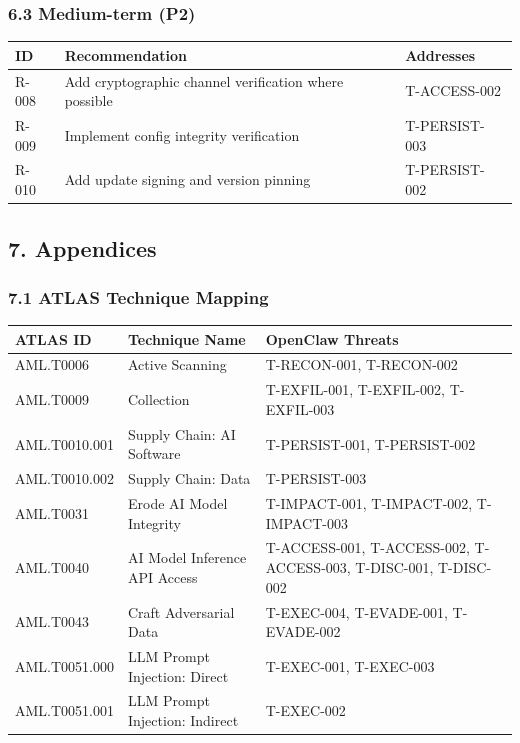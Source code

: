 \subsubsection{6.3 Medium-term (P2)}



\begin{table}[h]
\centering
\small
\begin{tabular}{|l|l|l|}
\hline
ID & Recommendation & Addresses \\
\hline
R-008 & Add cryptographic channel verification where possible & T-ACCESS-002 \\
\hline
R-009 & Implement config integrity verification & T-PERSIST-003 \\
\hline
R-010 & Add update signing and version pinning & T-PERSIST-002 \\
\hline
\end{tabular}
\end{table}



\hrulefill


\subsection{7. Appendices}


\subsubsection{7.1 ATLAS Technique Mapping}



\begin{table}[h]
\centering
\small
\begin{tabular}{|l|l|l|}
\hline
ATLAS ID & Technique Name & OpenClaw Threats \\
\hline
AML.T0006 & Active Scanning & T-RECON-001, T-RECON-002 \\
\hline
AML.T0009 & Collection & T-EXFIL-001, T-EXFIL-002, T-EXFIL-003 \\
\hline
AML.T0010.001 & Supply Chain: AI Software & T-PERSIST-001, T-PERSIST-002 \\
\hline
AML.T0010.002 & Supply Chain: Data & T-PERSIST-003 \\
\hline
AML.T0031 & Erode AI Model Integrity & T-IMPACT-001, T-IMPACT-002, T-IMPACT-003 \\
\hline
AML.T0040 & AI Model Inference API Access & T-ACCESS-001, T-ACCESS-002, T-ACCESS-003, T-DISC-001, T-DISC-002 \\
\hline
AML.T0043 & Craft Adversarial Data & T-EXEC-004, T-EVADE-001, T-EVADE-002 \\
\hline
AML.T0051.000 & LLM Prompt Injection: Direct & T-EXEC-001, T-EXEC-003 \\
\hline
AML.T0051.001 & LLM Prompt Injection: Indirect & T-EXEC-002 \\
\hline
\end{tabular}
\end{table}



